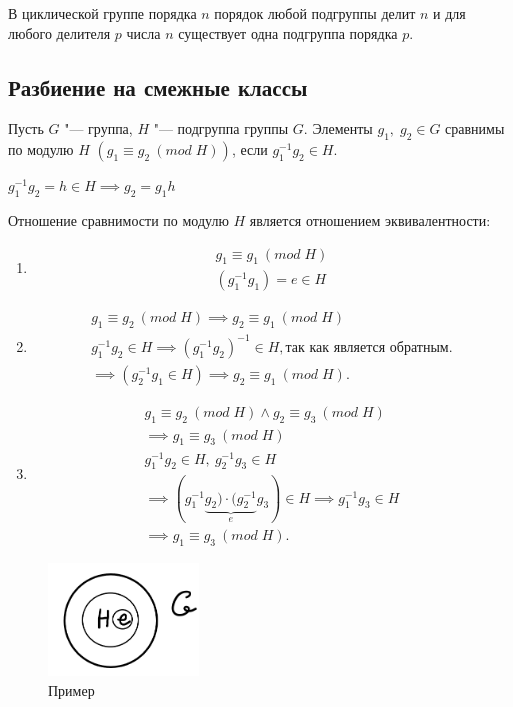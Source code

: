 \begin{theorem}
  В циклической группе порядка $n$ порядок любой подгруппы делит $n$ и для любого делителя $p$ числа $n$ существует одна подгруппа порядка $p$.
\end{theorem}

\subsection*{Разбиение на смежные классы}

\begin{definition}
  Пусть $G$ "--- группа, $H$ "--- подгруппа группы $G$. Элементы $g_1,\; g_2 \in G$ сравнимы по модулю $H$ $(g_1 \equiv g_2~(mod\;H))$, если $g_1^{-1}g_2 \in H$.

  $g_1^{-1}g_2 = h\in H \implies g_2 = g_1h$
\end{definition}

Отношение сравнимости по модулю $H$ является отношением эквивалентности:
\begin{enumerate}
  \item \begin{gather*}
    g_1 \equiv g_1~(mod\;H)\\
    (g_1^{-1}g_1) = e \in H
  \end{gather*}
  \item \begin{gather*}
    g_1 \equiv g_2~(mod\;H) \implies g_2 \equiv g_1~(mod\;H)\\
    g_1^{-1}g_2 \in H \implies (g_1^{-1}g_2)^{-1} \in H, \text{так как является обратным}.\\
    \implies (g_2^{-1}g_1 \in H) \implies g_2 \equiv g_1~(mod\;H).
  \end{gather*}
  \item \begin{gather*}
    g_1 \equiv g_2~(mod\;H) \wedge g_2 \equiv g_3~(mod\;H)\\
    \implies g_1 \equiv g_3~(mod\;H)\\
    g_1^{-1}g_2 \in H,~ g_2^{-1}g_3 \in H\\
    \implies (g_1^{-1}\underbrace{g_2)\cdot (g_2^{-1}}_{e} g_3) \in H \implies g_1^{-1}g_3 \in H\\
    \implies g_1\equiv g_3~(mod\;H).
  \end{gather*}
\end{enumerate}

\begin{figure}[H]
  \centering
  \includegraphics[height = 3cm]{images/groups_module.png}
  \caption{Пример}
\end{figure}

